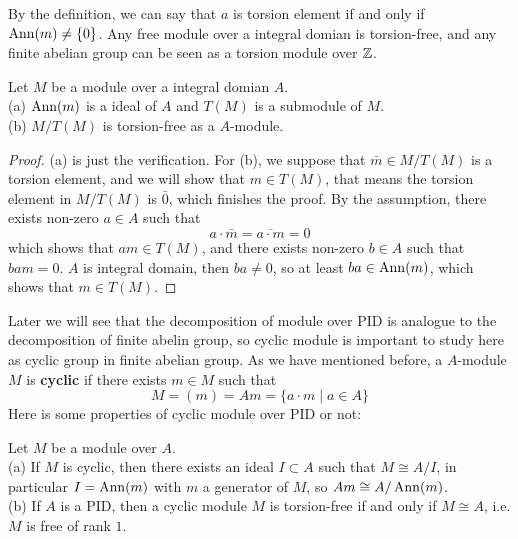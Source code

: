 By the definition, we can say that \(a\) is torsion element if and only if \(\operatorname{Ann}(m) \neq \{0\}\). Any free module over a integral domian is torsion-free, and any finite abelian group can be seen as a torsion module over \(\mathbb{Z}\).

\begin{proposition}
    Let \(M\) be a module over a integral domian \(A\).\\

    (a) \(\operatorname{Ann}(m)\) is a ideal of \(A\) and \(T(M)\) is a submodule of \(M\).\\

    (b) \(M/T(M)\) is torsion-free as a \(A\)-module.

    \begin{proof}
        (a) is just the verification. For (b), we suppose that \(\bar{m} \in M/T(M)\) is a torsion element, and we will show that \(m \in T(M)\), that means the torsion element in \(M/T(M)\) is \(\bar{0}\), which finishes the proof. By the assumption, there exists non-zero \(a \in A\) such that
        \[a \cdot \bar{m} = \overline{a \cdot m} = 0\]
        which shows that \(am \in T(M)\), and there exists non-zero \(b \in A\) such that \(bam = 0\). \(A\) is integral domain, then \(ba \neq 0\), so at least \(ba \in \operatorname{Ann}(m)\), which shows that \(m \in T(M)\).
    \end{proof}
\end{proposition}

Later we will see that the decomposition of module over PID is analogue to the decomposition of finite abelin group, so cyclic module is important to study here as cyclic group in finite abelian group. As we have mentioned before, a \(A\)-module \(M\) is \textbf{cyclic} if there exists \(m \in M\) such that
\[M = (m) = Am = \{a \cdot m \mid a \in A\}\]
Here is some properties of cyclic module over PID or not:

\begin{proposition} \label{cyclicmodule}
    Let \(M\) be a module over \(A\).\\

    (a) If \(M\) is cyclic, then there exists an ideal \(I \subset A\) such that \(M \cong A/I\), in particular \(I = \operatorname{Ann}(m)\) with \(m\) a generator of \(M\), so \(Am \cong A/\operatorname{Ann}(m)\).\\

    (b) If \(A\) is a PID, then a cyclic module \(M\) is torsion-free if and only if \(M \cong A\), i.e. \(M\) is free of rank \(1\).
\end{proposition}

